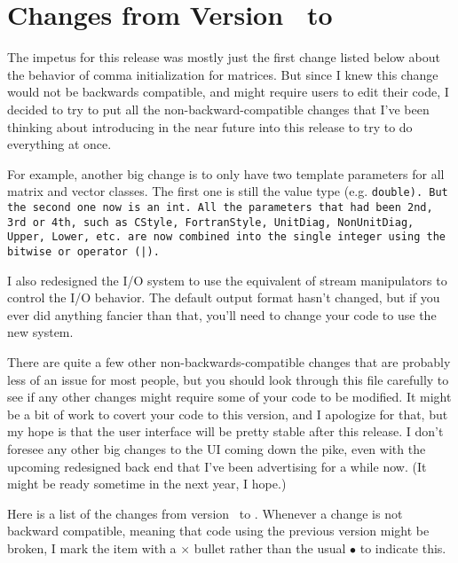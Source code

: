 
\section{Changes from Version \prevtmvversion\ to \tmvversion}
\label{Changes}

The impetus for this release was mostly just the first change listed below
about the behavior of comma initialization for matrices.  But since I knew
this change would not be backwards compatible, and might require users
to edit their code, I decided to try to put all the non-backward-compatible changes that I've been thinking about introducing in the near future into this
release to try to do everything at once. 

For example, another big change is to only have two template parameters for all matrix and vector
classes.  The first one is
still the value type (e.g. \tt{double}).  But the second one now is an \tt{int}.
All the parameters that had been 2nd, 3rd or 4th, such as \tt{CStyle}, \tt{FortranStyle}, 
\tt{UnitDiag}, \tt{NonUnitDiag}, \tt{Upper}, \tt{Lower}, etc. are now combined into the single
integer using the bitwise or operator (\tt{|}).  

I also redesigned the I/O system to use the equivalent of stream manipulators 
to control the I/O behavior.  The default output format hasn't changed, but 
if you ever did anything fancier than that, you'll need to change your code 
to use the new system.

There are quite a few other non-backwards-compatible changes that are 
probably less of an issue for most people, but you should look through 
this file carefully to see if any other changes might require some
of your code to be modified.  It might be a bit of work to covert your 
code to this version, and I apologize for that, but my hope is that the 
user interface will be pretty stable after this release.  I don't foresee any 
other big changes to the UI coming down the pike, even with the upcoming 
redesigned back end that I've been advertising for a while now.  (It might be ready sometime 
in the next year, I hope.)

Here is a list of the changes from version \prevtmvversion\ to \tmvversion.  
Whenever a change is not backward compatible, meaning that code using the previous version might be broken, I mark the item with a $\times$ bullet rather than the usual $\bullet$ to indicate this.  


